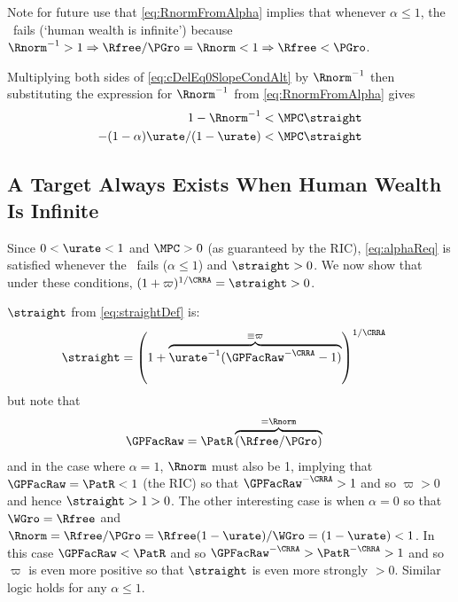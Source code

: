 \documentclass{handout}
\begin{document}
Note for future use that \eqref{eq:RnormFromAlpha} implies that whenever $\alpha \leq 1$, the \FHWCPGro~fails (`human wealth is infinite') because $\Rnorm^{-1} > 1 \Rightarrow \Rfree/\PGro = \Rnorm < 1 \Rightarrow \Rfree < \PGro$.  

Multiplying both sides of \eqref{eq:cDelEq0SlopeCondAlt} by $\Rnorm^{-1}$ then substituting the expression for $\Rnorm^{-1}$ from \eqref{eq:RnormFromAlpha} gives
\begin{equation}\begin{gathered}\begin{aligned}
  1- \Rnorm^{-1} & <  \MPCU \straight
\\ - (1-\alpha)\urate/(1-\urate) & <  \MPCU \straight \label{eq:alphaReq}
\end{aligned}\end{gathered}\end{equation}

\subsection{A Target Always Exists When Human Wealth Is Infinite}

Since $0 < \urate < 1$ and $\MPCU>0$ (as guaranteed by the RIC), \eqref{eq:alphaReq} is satisfied whenever the \FHWCPGro~fails ($\alpha \leq 1$) and $\straight > 0$.
We now show that under these conditions, $(1+\varpi)^{1/\CRRA}=\straight>0$.  

$\straight$ from \eqref{eq:straightDef} is:
\begin{equation}\begin{gathered}\begin{aligned}
  \straight & =  \left(1+\overbrace{\urate^{-1}(\GPFacRaw^{-\CRRA}-1)}^{\equiv \varpi}\right)^{1/\CRRA}
\end{aligned}\end{gathered}\end{equation}
but note that 
\begin{equation}\begin{gathered}\begin{aligned}
  \GPFacRaw & =  \PatR \overbrace{(\Rfree/\PGro)}^{=\Rnorm}
\end{aligned}\end{gathered}\end{equation}
and in the case where $\alpha=1$, $\Rnorm$ must also be 1, implying that $\GPFacRaw = \PatR < 1$ (the RIC) so that $\GPFacRaw^{-\CRRA} > 1$ and so $\varpi > 0$ and hence $\straight > 1 > 0$.  The other interesting case is when $\alpha=0$ so that $\WGro=\Rfree$ and $\Rnorm=\Rfree/\PGro=\Rfree(1-\urate)/\WGro=(1-\urate)<1$.  In this case $\GPFacRaw < \PatR$ and so $\GPFacRaw^{-\CRRA} > \PatR^{-\CRRA} > 1$ and so $\varpi$ is even more positive so that $\straight$ is even more strongly $>0$.  Similar logic holds for any $\alpha \leq 1$.  
\end{document}

